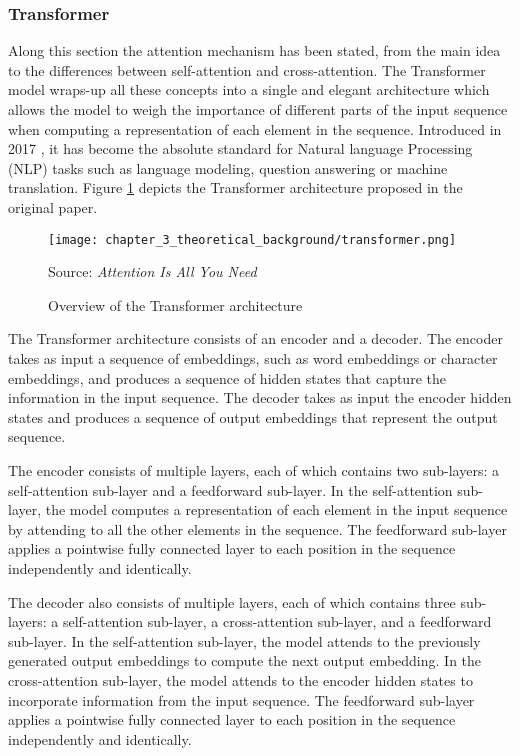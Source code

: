 \subsubsection{Transformer}
\label{subsubsec:3_transformer}


Along this section the attention mechanism has been stated, from the main idea to the differences between self-attention and cross-attention. The Transformer model wraps-up all these concepts into a single and elegant architecture which allows the model to weigh the importance of different parts of the input sequence when computing a representation of each element in the sequence. Introduced in 2017 \cite{vaswani2017attention}, it has become the absolute standard for Natural language Processing (NLP) tasks such as language modeling, question answering or machine translation. Figure \ref{fig:chapter_3_theoretical_background/transformer} depicts the Transformer architecture proposed in the original paper.

\begin{figure}[h]
	\centering
	\texttt{[image: chapter\_3\_theoretical\_background/transformer.png]}
	\caption{Overview of the Transformer architecture}
	Source: \textit{Attention Is All You Need} \cite{vaswani2017attention}
	\label{fig:chapter_3_theoretical_background/transformer}
\end{figure}

The Transformer architecture consists of an encoder and a decoder. The encoder takes as input a sequence of embeddings, such as word embeddings or character embeddings, and produces a sequence of hidden states that capture the information in the input sequence. The decoder takes as input the encoder hidden states and produces a sequence of output embeddings that represent the output sequence.

The encoder consists of multiple layers, each of which contains two sub-layers: a self-attention sub-layer and a feedforward sub-layer. In the self-attention sub-layer, the model computes a representation of each element in the input sequence by attending to all the other elements in the sequence. The feedforward sub-layer applies a pointwise fully connected layer to each position in the sequence independently and identically.

The decoder also consists of multiple layers, each of which contains three sub-layers: a self-attention sub-layer, a cross-attention sub-layer, and a feedforward sub-layer. In the self-attention sub-layer, the model attends to the previously generated output embeddings to compute the next output embedding. In the cross-attention sub-layer, the model attends to the encoder hidden states to incorporate information from the input sequence. The feedforward sub-layer applies a pointwise fully connected layer to each position in the sequence independently and identically.

